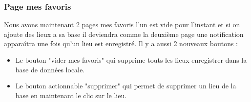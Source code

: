 \documentclass{article}
\begin{document}
\subsubsection{\color{purple}Page mes favoris}
\begin{minipage}{0.5\textwidth}
    
Nous avons maintenant 2 pages mes favoris l'un est vide pour l'instant et si on ajoute des lieux a sa base il deviendra comme la deuxième page une notification apparaîtra une fois qu'un lieu est enregistré. Il y a aussi 2 nouveaux boutons : \\

\begin{itemize}
    \item Le bouton "vider mes favoris" qui supprime touts les lieux enregistrer dans la base de données locale.
    \item Le bouton actionnable "supprimer" qui permet de supprimer un lieu de la base en maintenant le clic sur le lieu.
\end{itemize}
\end{minipage}
\hfill
\end{document}
